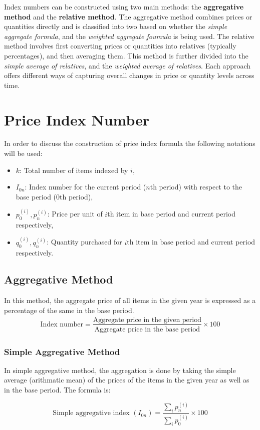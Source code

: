 \documentclass[twoside]{book}
\begin{document}
Index numbers can be constructed using two main methods: the \textbf{aggregative method} and the \textbf{relative method}. The aggregative method combines prices or quantities directly and is classified into two based on whether the \textit{simple aggregate formula}, and the \textit{weighted aggregate foumula} is being used. The relative method involves first converting prices or quantities into relatives (typically percentages), and then averaging them. This method is further divided into the \textit{simple average of relatives}, and the \textit{weighted average of relatives}. Each approach offers different ways of capturing overall changes in price or quantity levels across time.


\section{Price Index Number}
In order to discuss the construction of price index formula the following notations will be used:
\begin{itemize}
\item $k$: Total number of items indexed by $i$,
\item $I_{0n}$: Index number for the current period ($n$th period) with respect to the base period (0th period),
\item $p_0^{(i)}, p_n^{(i)}$: Price per unit of $i$th item in base period and current period respectively,
\item $q_0^{(i)}, q_n^{(i)}$: Quantity purchased for $i$th item in base period and current period respectively.
\end{itemize}

\subsection{Aggregative Method}

In this method, the aggregate price of all items in the given year is expressed as a percentage of the same in the base period.
\begin{align*}
\text{Index number} = \dfrac{\text{Aggregate price in the given period}}{\text{Aggregate price in the base period}} \times 100
\end{align*}

\subsubsection{Simple Aggregative Method}
In simple aggregative method, the aggregation is done by taking the simple average (arithmatic mean) of the prices of the items in the given year as well as in the base period. The formula is:
\begin{textbox}
\begin{equation*}
    \text{Simple aggregative index } (I_{0n}) = \frac{\displaystyle \sum_i p_n^{(i)}}{\displaystyle\sum_i p_0^{(i)}} \times 100
\end{equation*}
\end{textbox}
\end{document}
